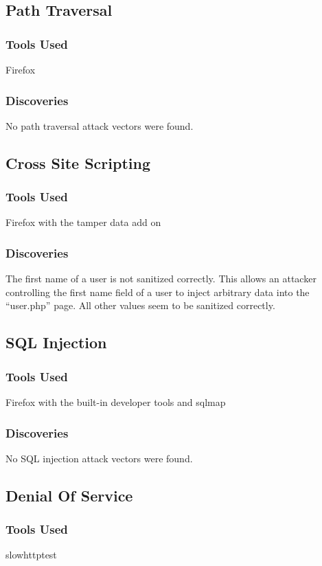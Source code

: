 \documentclass{article}
\begin{document}
\subsection{Path Traversal}
\subsubsection{Tools Used}
Firefox

\subsubsection{Discoveries}
No path traversal attack vectors were found.

\subsection{Cross Site Scripting }
\subsubsection{Tools Used}
Firefox with the tamper data add on

\subsubsection{Discoveries}
The first name of a user is not sanitized correctly. This allows an attacker controlling the first name field of a user to inject arbitrary data into the ``user.php'' page. All other values seem to be sanitized correctly.

\subsection{SQL Injection}
\subsubsection{Tools Used}
Firefox with the built-in developer tools and sqlmap

\subsubsection{Discoveries}
No SQL injection attack vectors were found.

\subsection{Denial Of Service}
\subsubsection{Tools Used}
slowhttptest
\end{document}
